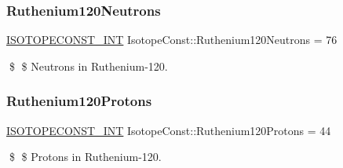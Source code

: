 \subsubsection{\texorpdfstring{Ruthenium120\+Neutrons}{Ruthenium120Neutrons}}
{\footnotesize\ttfamily \mbox{\hyperlink{group___isotope_const-_macros_ga5f18360b3e99483a35c32d789e62621c}{I\+S\+O\+T\+O\+P\+E\+C\+O\+N\+S\+T\+\_\+\+I\+NT}} Isotope\+Const\+::\+Ruthenium120\+Neutrons = 76}

\$ \$ Neutrons in Ruthenium-\/120. \mbox{\label{group___isotope_const-_ruthenium-_ru120_ga5fb70140fa8482fc159faea49edb143c}} 
\subsubsection{\texorpdfstring{Ruthenium120\+Protons}{Ruthenium120Protons}}
{\footnotesize\ttfamily \mbox{\hyperlink{group___isotope_const-_macros_ga5f18360b3e99483a35c32d789e62621c}{I\+S\+O\+T\+O\+P\+E\+C\+O\+N\+S\+T\+\_\+\+I\+NT}} Isotope\+Const\+::\+Ruthenium120\+Protons = 44}

\$ \$ Protons in Ruthenium-\/120. 